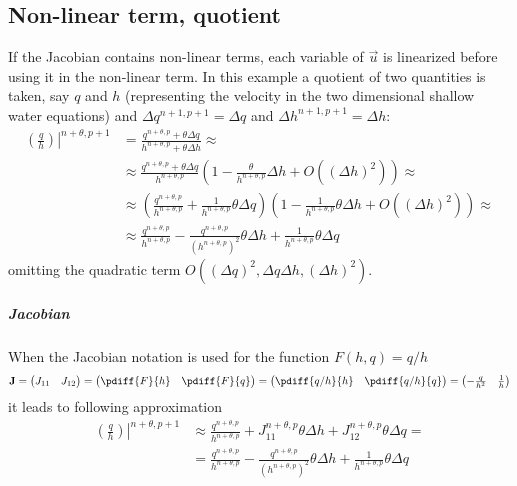 \subsection{Non-linear term, quotient}\label{sec:jacobians_with_non_linear_quotient_term}
If the Jacobian contains non-linear terms, each variable of $\vec{u}$ is linearized before using it in the non-linear term.
In this example a quotient of two quantities is taken, say $q$ and $h$ (representing the velocity in the two dimensional shallow water equations) and  $\Delta q^{n+1, p+1} = \Delta q$ and  $\Delta h^{n+1, p+1} = \Delta h$:
\begin{align}
    \left.\left(\frac{q}{h}\right)\right|^{n+\theta, p+1} & = \frac{ q^{n+\theta, p} + \theta  \Delta q }{ h^{n+\theta, p} + \theta  \Delta h} \approx
    \\
    & \approx \frac{ q^{n+\theta, p} + \theta  \Delta q }{ h^{n+\theta, p}} \left( 1 - \frac{\theta}{h^{n+\theta, p}} \Delta h  + O\left(  (\Delta h)^2 \right) \right)  \approx
    \\
    & \approx \left( \frac{ q^{n+\theta, p}}{ h^{n+\theta, p}} + \frac{1}{ h^{n+\theta, p}}  \theta\Delta q \right)
    \left( 1 - \frac{1}{h^{n+\theta, p}} \theta\Delta h  + O\left(  (\Delta h)^2 \right) \right)  \approx
    \\
    & \approx  \frac{ q^{n+\theta, p}}{ h^{n+\theta, p}}
    - \frac{ q^{n+\theta, p}}{ (h^{n+\theta, p})^2} \theta \Delta h
    + \frac{1}{ h^{n+\theta, p}}  \theta\Delta q
\end{align}
omitting the quadratic term $O((\Delta q)^2, \Delta q \Delta h, (\Delta h)^2)$.
\subparagraph*{Jacobian}
When the Jacobian notation is  used for the function $F(h,q) = q/h$
\begin{align}
    \mat{J} =
    \begin{pmatrix}
        J_{11} & J_{12}
    \end{pmatrix}
    =
    \begin{pmatrix}
        \pdiff{F}{h} & \pdiff{F}{q}
    \end{pmatrix}
    =
    \begin{pmatrix}
        \pdiff{q/h}{h} & \pdiff{q/h}{q}
    \end{pmatrix}
    =
    \begin{pmatrix}
        -\frac{q}{h^2} & \frac{1}{h}
    \end{pmatrix}
\end{align}
it leads to following approximation
\begin{align}
    \left.\left(\frac{q}{h}\right)\right|^{n+\theta, p+1} &  \approx  \frac{q^{n+\theta, p}}{h^{n+\theta, p}}
    + J_{11}^{n+\theta, p} \theta \Delta h
    + J_{12}^{n+\theta, p} \theta \Delta q =
    \\
    & = \frac{q^{n+\theta, p}}{h^{n+\theta, p}}
    - \frac{q^{n+\theta, p}}{(h^{n+\theta, p})^2} \theta \Delta h
    + \frac{1}{h^{n+\theta, p}} \theta \Delta q
\end{align}
